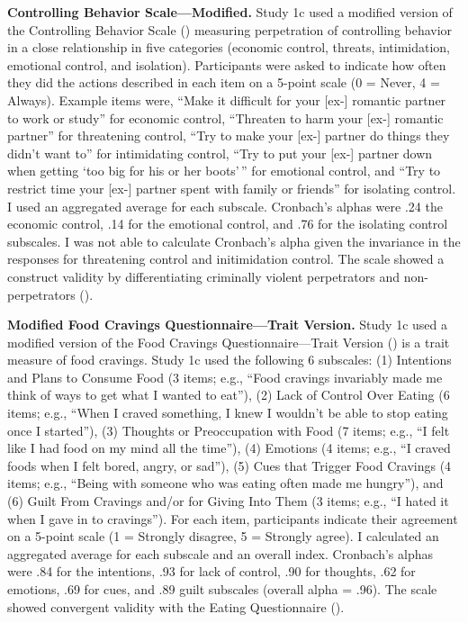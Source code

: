 \documentclass[
]{udthesis}
\begin{document}
\textbf{Controlling Behavior Scale---Modified.} Study 1c used a modified version of the Controlling Behavior Scale () measuring perpetration of controlling behavior in a close relationship in five categories (economic control, threats, intimidation, emotional control, and isolation). Participants were asked to indicate how often they did the actions described in each item on a 5-point scale (0 = Never, 4 = Always). Example items were, ``Make it difficult for your {[}ex-{]} romantic partner to work or study'' for economic control, ``Threaten to harm your {[}ex-{]} romantic partner'' for threatening control, ``Try to make your {[}ex-{]} partner do things they didn't want to'' for intimidating control, ``Try to put your {[}ex-{]} partner down when getting `too big for his or her boots'\,'' for emotional control, and ``Try to restrict time your {[}ex-{]} partner spent with family or friends'' for isolating control. I used an aggregated average for each subscale. Cronbach's alphas were .24 the economic control, .14 for the emotional control, and .76 for the isolating control subscales. I was not able to calculate Cronbach's alpha given the invariance in the responses for threatening control and initimidation control. The scale showed a construct validity by differentiating criminally violent perpetrators and non-perpetrators ().

\textbf{Modified Food Cravings Questionnaire---Trait Version.} Study 1c used a modified version of the Food Cravings Questionnaire---Trait Version () is a trait measure of food cravings. Study 1c used the following 6 subscales: (1) Intentions and Plans to Consume Food (3 items; e.g., ``Food cravings invariably made me think of ways to get what I wanted to eat''), (2) Lack of Control Over Eating (6 items; e.g., ``When I craved something, I knew I wouldn't be able to stop eating once I started''), (3) Thoughts or Preoccupation with Food (7 items; e.g., ``I felt like I had food on my mind all the time''), (4) Emotions (4 items; e.g., ``I craved foods when I felt bored, angry, or sad''), (5) Cues that Trigger Food Cravings (4 items; e.g., ``Being with someone who was eating often made me hungry''), and (6) Guilt From Cravings and/or for Giving Into Them (3 items; e.g., ``I hated it when I gave in to cravings''). For each item, participants indicate their agreement on a 5-point scale (1 = Strongly disagree, 5 = Strongly agree). I calculated an aggregated average for each subscale and an overall index. Cronbach's alphas were .84 for the intentions, .93 for lack of control, .90 for thoughts, .62 for emotions, .69 for cues, and .89 guilt subscales (overall alpha = .96). The scale showed convergent validity with the Eating Questionnaire ().
\end{document}
